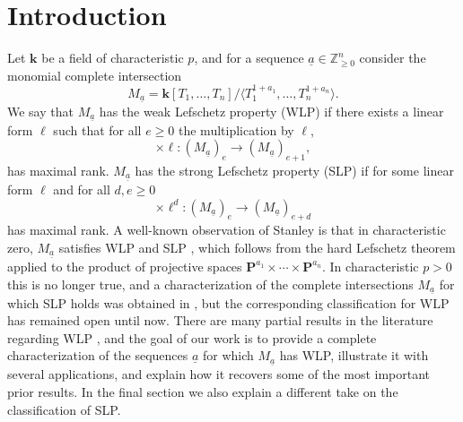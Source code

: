 \documentclass[11pt,reqno]{amsart}
\newcommand{\defi}[1]{{\upshape\sffamily #1}}
\def\kk{{\mathbf k}}
\newcommand{\bb}[1]{\mathbb{#1}}
\newcommand{\ul}[1]{\underline{#1}}
\def\PP{{\mathbf P}}
\def\lra{\longrightarrow}
\theoremstyle{definition}
\theoremstyle{remark}
\numberwithin{equation}{section}
\begin{document}
\maketitle

\section{Introduction}

Let $\kk$ be a field of characteristic $p$, and for a sequence $\ul{a}\in\bb{Z}^n_{\geq 0}$ consider the monomial complete intersection
\begin{equation}\label{eq:def-Ma} 
M_{\ul{a}} = \kk[T_1,\ldots,T_n]/\langle T_1^{1+a_1},\ldots,T_n^{1+a_n}\rangle.
\end{equation}
We say that $M_{\ul{a}}$ has the \defi{weak Lefschetz property (WLP)} if there exists a linear form $\ell$ such that for all $e\geq 0$ the multiplication by $\ell$, 
\begin{equation}\label{eq:timesT-maxrk}
\times \ell: (M_{\ul{a}})_e \lra (M_{\ul{a}})_{e+1},
\end{equation}
has maximal rank. $M_{\ul{a}}$ has the \defi{strong Lefschetz property (SLP)} if for some linear form $\ell$ and for all $d,e\geq 0$
\[\times \ell^d: (M_{\ul{a}})_e \lra (M_{\ul{a}})_{e+d}\]
has maximal rank. A well-known observation of Stanley is that in characteristic zero, $M_{\ul{a}}$ satisfies WLP and SLP \cites{stanley,watanabe}, which follows from the hard Lefschetz theorem applied to the product of projective spaces $\PP^{a_1}\times\cdots\times\PP^{a_n}$. In characteristic $p>0$ this is no longer true, and a characterization of the complete intersections $M_{\ul{a}}$ for which SLP holds was obtained in \cites{nick,lund-nick, Cook12}, but the corresponding classification for WLP has remained open until now. There are many partial results in the literature regarding WLP \cites{bre-kai,kus-vra,Vraciu,Cook12}, and the goal of our work is to provide a complete characterization of the sequences $\ul{a}$ for which $M_{\ul{a}}$ has WLP, illustrate it with several applications, and explain how it recovers some of the most important prior results. In the final section we also explain a different take on the classification of SLP.
\end{document}

